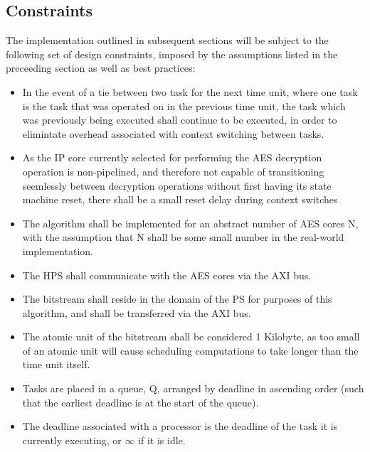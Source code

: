 \subsection{Constraints}\label{subsec:EDFConstraints}
The implementation outlined in subsequent sections will be subject to the following set of design constraints, imposed by the assumptions listed in the preceeding section as well as best practices:
\begin{itemize}
    \item In the event of a tie between two task for the next time unit, where one task is the task that was operated on in the previous time unit, the task which was previously being executed shall continue to be executed, in order to elimintate overhead associated with context switching between tasks.
    \item As the IP core currently selected for performing the AES decryption operation is non-pipelined, and therefore not capable of transitioning seemlessly between decryption operations without first having its state machine reset, there shall be a small reset delay during context switches
    \item The algorithm shall be implemented for an abstract number of AES cores N, with the assumption that N shall be some small number in the real-world implementation.
    \item The HPS shall communicate with the AES cores via the AXI bus.
    \item The bitstream shall reside in the domain of the PS for purposes of this algorithm, and shall be transferred via the AXI bus.
    \item The atomic unit of the bitstream shall be considered 1 Kilobyte, as too small of an atomic unit will cause scheduling computations to take longer than the time unit itself.
    \item Tasks are placed in a queue, Q, arranged by deadline in ascending order (such that the earliest deadline is at the start of the queue). 
    \item The deadline associated with a processor is the deadline of the task it is currently executing, or $\infty$ if it is idle.
\end{itemize}


